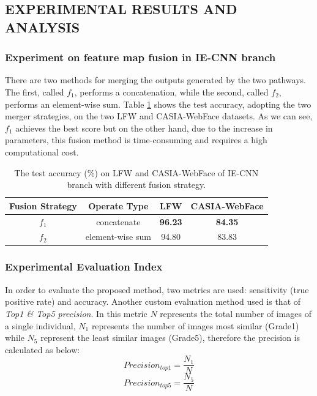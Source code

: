 \subsection{EXPERIMENTAL RESULTS AND ANALYSIS}
\subsubsection{Experiment on feature map fusion in IE-CNN branch}
There are two methods for merging the outputs generated by the two pathways. 
The first, called $f_1$, performs a concatenation, while the second, called 
$f_2$, performs an element-wise sum. Table \ref{testAccuracyIE-CNN} shows the test accuracy, adopting 
the two merger strategies, on the two LFW and CASIA-WebFace datasets. 
As we can see, $f_1$ achieves the best score but on the other hand, due to the 
increase in parameters, this fusion method is time-consuming and requires a 
high computational cost.
\begin{table}[h!]
    \centering
    \begin{adjustbox}{max width=\textwidth}
    \begin{tabular}{|c|c|c|c|}
        \hline
        \bfseries{Fusion Strategy} & \bfseries{Operate Type} & \bfseries{LFW} &\bfseries{CASIA-WebFace}\\
        \hline
        $f_1$ & concatenate & \bfseries{96.23} & \bfseries{84.35}\\
        \hline
        $f_2$ & element-wise sum & 94.80 & 83.83\\
        \hline
    \end{tabular}
    \end{adjustbox}
    \caption{The test accuracy (\%) on LFW and CASIA-WebFace of IE-CNN branch with different fusion strategy.}
    \label{testAccuracyIE-CNN}
\end{table}

\subsubsection{Experimental Evaluation Index}
In order to evaluate the proposed method, two metrics are used: sensitivity (true positive rate) and accuracy. Another custom evaluation method used is that of \emph{Top1 \& Top5 precision}. In this metric $N$ represents the total number of images of a single individual, $N_1$ represents the number of images most similar (Grade1) while $N_5$ represent the least similar images (Grade5), therefore the precision is calculated as below:
\begin{equation}
    Precision_{top1}= \frac{N_1}{N}
\end{equation}
\begin{equation}
    Precision_{top5}= \frac{N_5}{N}
\end{equation}


